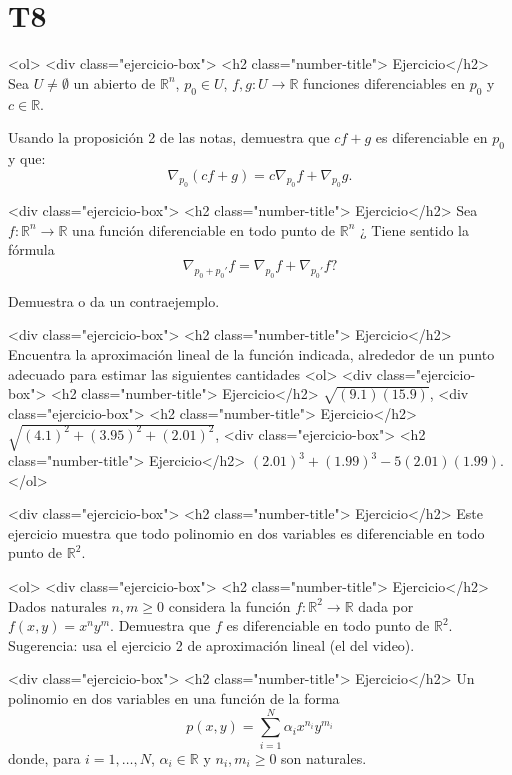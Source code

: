 \documentclass{article}
\theoremstyle{definition}
\begin{document}
\section*{T8 }

<ol>
<div class="ejercicio-box"> <h2 class="number-title"> Ejercicio</h2>  Sea $U\ne \emptyset$ un abierto de $\mathbb{R}^n$, $p_0\in U$, $f,g :U \to \mathbb{R}$
  funciones diferenciables en $p_0$ y  $c\in \mathbb{R}$.

  Usando la proposición 2 de las notas,  demuestra que $cf+g$ es diferenciable
  en $p_0$ y que:
  $$
  \nabla_{p_0}(cf+g)=c\nabla_{p_0} f+ \nabla_{p_0}g.
  $$

<div class="ejercicio-box"> <h2 class="number-title"> Ejercicio</h2> Sea $f:\mathbb{R}^n\to \mathbb{R}$
  una función diferenciable en todo punto de $\mathbb{R}^n$ ¿  Tiene sentido la fórmula
  $$
  \nabla_{p_0+p_0'}f=\nabla_{p_0}f+\nabla_{p_0'}f ?
  $$

  Demuestra o da un contraejemplo.

<div class="ejercicio-box"> <h2 class="number-title"> Ejercicio</h2> Encuentra la aproximación lineal de la función indicada, alrededor de un punto adecuado
  para estimar  las siguientes cantidades
  <ol>
  <div class="ejercicio-box"> <h2 class="number-title"> Ejercicio</h2> $\sqrt{(9.1)(15.9)}$,
  <div class="ejercicio-box"> <h2 class="number-title"> Ejercicio</h2> $\sqrt{(4.1)^2+(3.95)^2+(2.01)^2}$,
  <div class="ejercicio-box"> <h2 class="number-title"> Ejercicio</h2> $(2.01)^3+(1.99)^3-5(2.01)(1.99)$.
  </ol>

  
          <div class="ejercicio-box"> <h2 class="number-title"> Ejercicio</h2>\label{Ejer:DifPolinomios}
            Este ejercicio muestra que todo polinomio en dos variables es diferenciable en todo
            punto de $\mathbb{R}^2$.

            <ol>
            <div class="ejercicio-box"> <h2 class="number-title"> Ejercicio</h2> Dados naturales $n,m\geq 0$ considera la función $f:\mathbb{R}^2\to \mathbb{R}$
              dada por $f(x,y)=x^ny^m$. Demuestra que $f$ es diferenciable en todo punto de $\mathbb{R}^2$.  Sugerencia: usa el ejercicio 2 de aproximación
              lineal (el del video). 

             

            <div class="ejercicio-box"> <h2 class="number-title"> Ejercicio</h2> Un polinomio en dos variables en una función de la forma
              $$
              p(x,y)= \sum_{i=1}^N \alpha_i x^{n_i}y^{m_i}
              $$
              donde, para $i=1,\dots, N$,  $\alpha_i\in \mathbb{R}$ y $n_i,m_i\geq 0$ son naturales.
\end{document}
